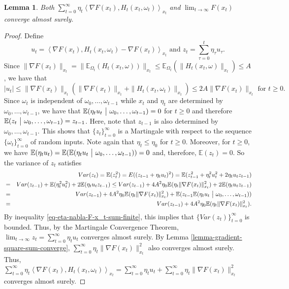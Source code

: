 \documentclass{amsart}
\newcommand{\E}{\mathbb{E}}
\theoremstyle{plain}
\newtheorem{lemma}[theorem]{Lemma}
\theoremstyle{definition}
\theoremstyle{remark}
\numberwithin{theorem}{section}
\numberwithin{equation}{section}
\begin{document}
\begin{lemma}\label{lemma-F-x-t-converge-ada}
Both $\sum_{t=0}^\infty \eta_t\left\langle \nabla F(x_t), H_t(x_t,\omega_t)\right\rangle_{x_t}$ and $\lim_{t\rightarrow \infty} F(x_t)$ converge almost surely.
\end{lemma}

\begin{proof}
Define 
\begin{equation}\label{eq-lemma-F-x-t-converge-ada-1}
u_t = \left\langle \nabla F(x_t), H_t(x_t,\omega_t) - \nabla F(x_t)\right\rangle_{x_t} \text{ and  } z_t = \sum_{\tau=0}^t \eta_\tau u_\tau.
\end{equation} 
Since $\|\nabla F(x_t)\|_{x_t} = \|\E_{\Omega_t}(H_t(x_t,\omega))\|_{x_t} \leq \E_{\Omega_t}(\|H_t(x_t,\omega)\|_{x_t}) \leq A$, we have that 
\[
|u_t| \leq \|\nabla F(x_t)\|_{x_t} (\|\nabla F(x_t)\|_{x_t} + \|H_t(x_t,\omega_t)\|_{x_t}) \leq 2A \|\nabla F(x_t)\|_{x_t} \text{ for } t\geq 0.
\]
Since $\omega_t$ is independent of $\omega_0,\dots, \omega_{t-1}$ while $x_t$ and $\eta_t$ are determined by $\omega_0,\dots, \omega_{t-1}$, we have that $\E(\eta_t u_t~\big{|}~\omega_0,\dots,\omega_{t-1}) = 0$ for $t \geq 0$ and therefore $\E(z_t~\big{|}~\omega_0,\dots,\omega_{t-1})=z_{t-1}$. Here, note that $z_{t-1}$ is also determined by $\omega_0,\dots,\omega_{t-1}$. This shows that $\{z_t\}_{t=0}^\infty$ is a Martingale with respect to the sequence $\{\omega_t\}_{t=0}^\infty$ of random inputs. Note again that $\eta_t\leq \eta_0$ for $t \geq 0$. Moreover, for $t\geq 0$, we have $\E(\eta_t u_t) = \E(\E(\eta_t u_t~\big{|}~\omega_0,\dots,\omega_{t-1}))=0$ and, therefore, $\E(z_t)=0$. So the variance of $z_t$ satisfies
\begin{eqnarray*}
&& Var(z_t)  =  \E(z_t^2) =E((z_{t-1}+\eta_t u_t)^2) = \E(z_{t-1}^2 + \eta_t^2 u_t^2 +  2\eta_t u_t z_{t-1}) \\
& = &   Var(z_{t-1}) + \E(\eta_t^2u_t^2) + 2 \E( \eta_t u_t z_{t-1}) \leq  Var(z_{t-1}) + 4A^2\eta_0\E(\eta_t \|\nabla F(x_t)\|_{x_t}^2) + 2 \E(\eta_t u_t z_{t-1}) \\
& = & Var(z_{t-1}) + 4A^2\eta_0\E(\eta_t \|\nabla F(x_t)\|_{x_t}^2)+ \E( z_{t-1}\E(\eta_t u_t~\big{|}~\omega_0,\dots,\omega_{t-1}))\\
& = & Var(z_{t-1}) + 4A^2\eta_0\E(\eta_t \|\nabla F(x_t)\|_{x_t}^2).
\end{eqnarray*}
By inequality \eqref{eq-eta-nabla-F-x_t-sum-finite}, this implies that $\{Var(z_t)\}_{t=0}^\infty$ is bounded. Thus, by the Martingale Convergence Theorem, $\lim_{t\rightarrow \infty}z_t =  \sum_{t=0}^\infty \eta_t u_t$ converges almost surely. By Lemma \ref{lemma-gradient-square-sum-converge}, $\sum_{t=0}^\infty \eta_t \|\nabla F(x_t)\|_{x_t}^2$ also converges almost surely. Thus, $\sum_{t=0}^\infty \eta_t \left\langle \nabla F(x_t), H_t(x_t,\omega_t)\right\rangle_{x_t} = \sum_{t=0}^\infty \eta_t u_t + \sum_{t=0}^\infty \eta_t \|\nabla F(x_t)\|_{x_t}^2$ converges almost surely.


\end{proof}
\end{document}
